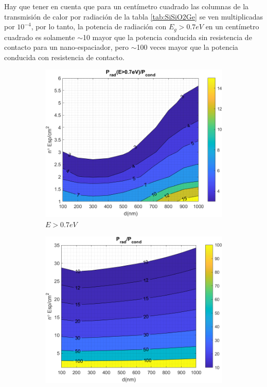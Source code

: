 Hay que tener en cuenta que para un centímetro cuadrado las columnas de la transmisión de calor por radiación de la tabla \ref{tab:SiSiO2Ge} se ven multiplicadas por $10^{-4}$, por lo tanto, la potencia de radiación con $E_g>0.7eV$ en un centímetro cuadrado es solamente $\sim$10 mayor que la potencia conducida sin resistencia de contacto para un nano-espaciador, pero $\sim$100 veces mayor que la potencia conducida con resistencia de contacto.
\begin{figure}[H]
	\centering
	\begin{subfigure}[b]{0.49\textwidth}
		\centering
		\includegraphics[width=1.00\textwidth]{figuras/Resultados/RelacionCondRad/SiGe.png}
		\caption{$E>0.7eV$}
		\label{fig:rel_SiSiO2Ge}
	\end{subfigure}
	\hfill
	\begin{subfigure}[b]{0.49\textwidth}
		\centering
		\includegraphics[width=1.00\textwidth]{figuras/Resultados/RelacionCondRad/SiGe_full.png}

\end{subfigure}
\end{figure}
